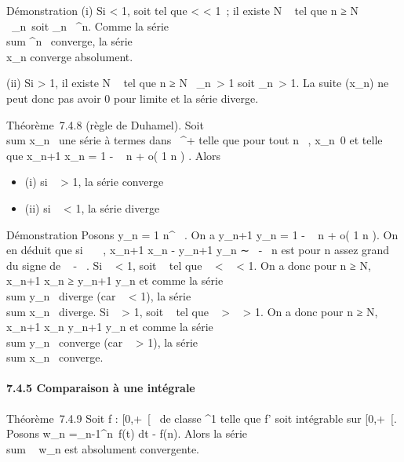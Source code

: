 \documentclass[]{article}
\begin{document}
Démonstration (i) Si \ell < 1, soit \rho tel que \ell < \rho
< 1~; il existe N \in {}~ tel que n ≥ N
\rigtharrow~\rootn\of\x_n\
\leq \rho soit
\x_n\ \leq
\rho^n. Comme la série
\\sum  \rho^n~
converge, la série \\\sum
 x_n converge absolument.

(ii) Si \ell > 1, il existe N \in {}~ tel que n ≥ N
\rigtharrow~\rootn\of\x_n\
> 1 soit
\x_n\
> 1. La suite (x_n) ne peut donc pas avoir 0 pour
limite et la série diverge.

Théorème~7.4.8 (règle de Duhamel). Soit
\\sum  x_n~ une
série à termes dans ~^+ telle que pour tout n \in {}~,
x_n\neq~0 et telle que  x_n+1
\over x_n = 1 - \lambda~ \over n +
o( 1 \over n ) . Alors

\begin{itemize}
\itemsep1pt\parskip0pt
\item
  (i) si \lambda~ > 1, la série converge
\item
  (ii) si \lambda~ < 1, la série diverge
\end{itemize}

Démonstration Posons y_n = 1 \over
n^\alpha~ . On a  y_n+1 \over
y_n = 1 - \alpha~ \over n + o( 1
\over n ). On en déduit que si
\alpha~\neq~\lambda~,  x_n+1 \over
x_n - y_n+1 \over y_n
∼ \alpha~-\lambda~ \over n est pour n assez grand du signe de \alpha~ -
\lambda~. Si \lambda~ < 1, soit \alpha~ tel que \lambda~ < \alpha~ < 1. On
a donc pour n ≥ N,  x_n+1 \over x_n
≥ y_n+1 \over y_n et comme la série
\\sum  y_n~
diverge (car \alpha~ < 1), la série
\\sum  x_n~
diverge. Si \lambda~ > 1, soit \alpha~ tel que \lambda~ > \alpha~
> 1. On a donc pour n ≥ N,  x_n+1
\over x_n \leq y_n+1
\over y_n et comme la série
\\sum  y_n~
converge (car \alpha~ > 1), la série
\\sum  x_n~
converge.

\paragraph{7.4.5 Comparaison à une intégrale}

Théorème~7.4.9 Soit f : [0,+\infty~[\rightarrow~  de classe ^1 telle que
f' soit intégrable sur [0,+\infty~[. Posons w_n
=\int  _n-1^n~f(t) dt - f(n).
Alors la série \\sum ~
w_n est absolument convergente.
\end{document}
